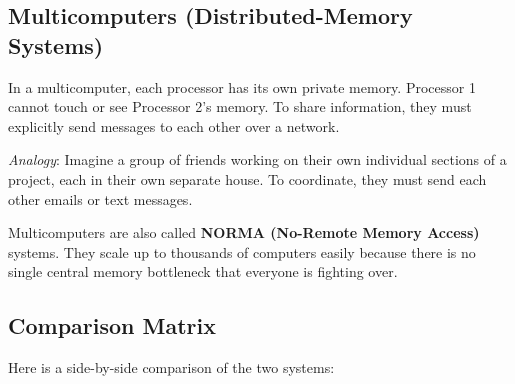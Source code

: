 \documentclass[11pt,a4paper]{article}
\begin{document}
\subsection{Multicomputers (Distributed-Memory Systems)}
In a multicomputer, each processor has its own private memory. Processor 1 cannot touch or see Processor 2's memory. To share information, they must explicitly send messages to each other over a network.

\textit{Analogy}: Imagine a group of friends working on their own individual sections of a project, each in their own separate house. To coordinate, they must send each other emails or text messages.

\begin{center}
\end{center}

\begin{notebox}
Multicomputers are also called \textbf{NORMA (No-Remote Memory Access)} systems. They scale up to thousands of computers easily because there is no single central memory bottleneck that everyone is fighting over.
\end{notebox}

\subsection{Comparison Matrix}
Here is a side-by-side comparison of the two systems:
\end{document}
